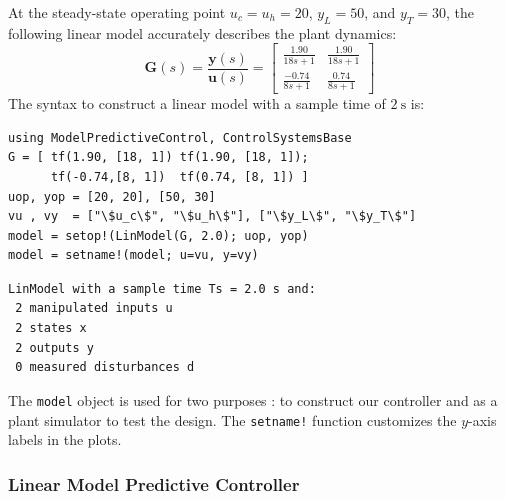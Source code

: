 At the steady-state operating point $u_c=u_h=20$, $y_L=50$, and $y_T=30$, the following linear model accurately describes the plant dynamics:
\begin{equation}
\mathbf{G}(s) = \frac{\mathbf{y}(s)}{\mathbf{u}(s)} =
\begin{bmatrix}
    \frac{1.90}{18s+1} & \frac{1.90}{18s+1} \\[3pt]
    \frac{-0.74}{8s+1} & \frac{0.74}{8s+1}
\end{bmatrix}
\end{equation}
The syntax to construct a linear model with a sample time of $\SI{2}{\second}$ is:
\begin{verbatim}
using ModelPredictiveControl, ControlSystemsBase
G = [ tf(1.90, [18, 1]) tf(1.90, [18, 1]);
      tf(-0.74,[8, 1])  tf(0.74, [8, 1]) ]
uop, yop = [20, 20], [50, 30]
vu , vy  = ["\$u_c\$", "\$u_h\$"], ["\$y_L\$", "\$y_T\$"]
model = setop!(LinModel(G, 2.0); uop, yop)
model = setname!(model; u=vu, y=vy)
\end{verbatim}
\spacerepl
\begin{verbatim}
LinModel with a sample time Ts = 2.0 s and:
 2 manipulated inputs u
 2 states x
 2 outputs y
 0 measured disturbances d
\end{verbatim}
The \texttt{model} object is used for two purposes : to construct our controller and as a plant simulator to test the design. The \texttt{setname!} function customizes the $y$-axis labels in the plots.

\subsubsection{Linear Model Predictive Controller}

